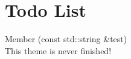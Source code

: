 \chapter{Todo List}
\hypertarget{todo}{}\label{todo}

\begin{DoxyRefList}
\item[Member \doxylink{class_my_library_1_1_example_a1c0046b0674eb4cad09c5d3e943912b8}{My\+Library\+::Example\+::test} (const std\+::string \&test)]\hfill \\
\label{todo__todo000001}%
%
This theme is never finished!
\end{DoxyRefList}